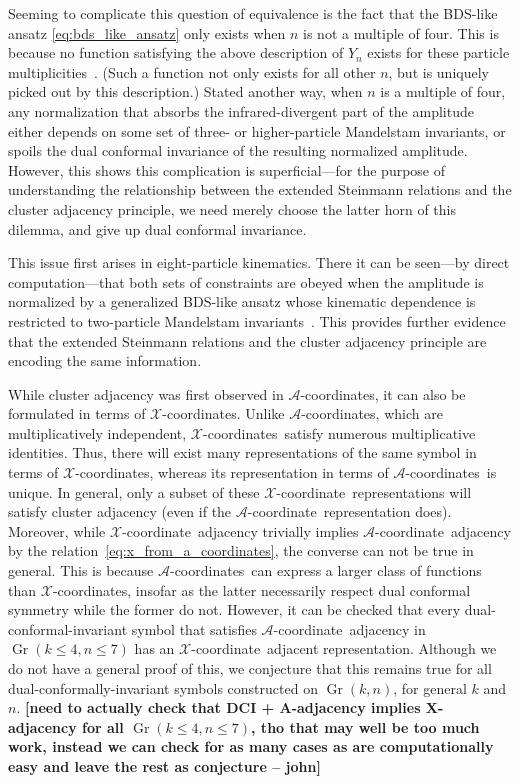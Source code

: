\documentclass[11pt]{article}
\DeclareMathOperator{\Gr}{Gr}
\def\xcoord{$\mathcal{X}$-coordinate}
\def\xcoords{$\mathcal{X}$-coordinates}
\def\acoord{$\mathcal{A}$-coordinate}
\def\acoords{$\mathcal{A}$-coordinates}
\def\draftnote#1{{\bf [#1]}}
\begin{document}
Seeming to complicate this question of equivalence is the fact that the BDS-like ansatz \eqref{eq:bds_like_ansatz} only exists when $n$ is not a multiple of four. This is because no function satisfying the above description of $Y_n$ exists for these particle multiplicities~\cite{Yang:2010az,Dixon:2016nkn}. (Such a function not only exists for all other $n$, but is uniquely picked out by this description.) Stated another way, when $n$ is a multiple of four, any normalization that absorbs the infrared-divergent part of the amplitude either depends on some set of three- or higher-particle Mandelstam invariants, or spoils the dual conformal invariance of the resulting normalized amplitude. However, this shows this complication is superficial---for the purpose of understanding the relationship between the extended Steinmann relations and the cluster adjacency principle, we need merely choose the latter horn of this dilemma, and give up dual conformal invariance. 

This issue first arises in eight-particle kinematics. There it can be seen---by direct computation---that both sets of constraints are obeyed when the amplitude is normalized by a generalized BDS-like ansatz whose kinematic dependence is restricted to two-particle Mandelstam invariants~\cite{cluster_subalgebras_ii}. This provides further evidence that the extended Steinmann relations and the cluster adjacency principle are encoding the same information.

While cluster adjacency was first observed in \acoords, it can also be formulated in terms of \xcoords. Unlike \acoords, which are multiplicatively independent, \xcoords\ satisfy numerous multiplicative identities. Thus, there will exist many representations of the same symbol in terms of \xcoords, whereas its representation in terms of \acoords\ is unique. In general, only a subset of these \xcoord\ representations will satisfy cluster adjacency (even if the \acoord\ representation does). Moreover, while \xcoord\ adjacency trivially implies \acoord\ adjacency by the relation~\eqref{eq:x_from_a_coordinates}, the converse can not be true in general. This is because \acoords\ can express a larger class of functions than \xcoords, insofar as the latter necessarily respect dual conformal symmetry while the former do not. However, it can be checked that every dual-conformal-invariant symbol that satisfies \acoord\ adjacency in $\Gr(k\le4,n\le7)$ has an \xcoord\ adjacent representation. Although we do not have a general proof of this, we conjecture that this remains true for all dual-conformally-invariant symbols constructed on $\Gr(k,n)$, for general $k$ and $n$.  \draftnote{need to actually check that DCI + A-adjacency implies X-adjacency for all $\Gr(k\le4,n\le7)$, tho that may well be too much work, instead we can check for as many cases as are computationally easy and leave the rest as conjecture -- john}
\end{document}
